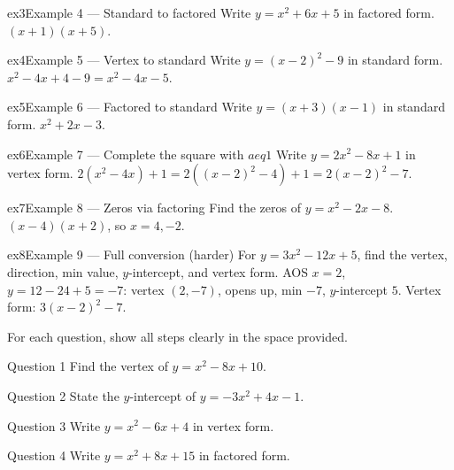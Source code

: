 \documentclass[11pt]{article}
\begin{document}
\begin{example}{ex3}{Example 4 --- Standard to factored}
Write $y=x^2+6x+5$ in factored form.
\soln $(x+1)(x+5).$
\end{example}

\begin{example}{ex4}{Example 5 --- Vertex to standard}
Write $y=(x-2)^2-9$ in standard form.
\soln $x^2-4x+4-9=x^2-4x-5.$
\end{example}

\begin{example}{ex5}{Example 6 --- Factored to standard}
Write $y=(x+3)(x-1)$ in standard form.
\soln $x^2+2x-3.$
\end{example}

\begin{example}{ex6}{Example 7 --- Complete the square with $a
eq1$}
Write $y=2x^2-8x+1$ in vertex form.
\soln $2(x^2-4x)+1=2((x-2)^2-4)+1=2(x-2)^2-7.$
\end{example}

\begin{example}{ex7}{Example 8 --- Zeros via factoring}
Find the zeros of $y=x^2-2x-8$.
\soln $(x-4)(x+2)$, so $x=4,-2.$
\end{example}

\begin{example}{ex8}{Example 9 --- Full conversion (harder)}
For $y=3x^2-12x+5$, find the vertex, direction, min value, $y$-intercept, and vertex form.
\soln AOS $x=2$, $y=12-24+5=-7$: vertex $(2,-7)$, opens up, min $-7$, $y$-intercept $5$. Vertex form: $3(x-2)^2-7.$
\end{example}

\clearpage
{}
For each question, show all steps clearly in the space provided.

\begin{qbox}{Question 1}
Find the vertex of $y=x^2-8x+10$.\workspace{2.2cm}
\end{qbox}

\begin{qbox}{Question 2}
State the $y$-intercept of $y=-3x^2+4x-1$.\workspace{1.8cm}
\end{qbox}

\begin{qbox}{Question 3}
Write $y=x^2-6x+4$ in vertex form.\workspace{2.2cm}
\end{qbox}

\begin{qbox}{Question 4}
Write $y=x^2+8x+15$ in factored form.\workspace{1.8cm}
\end{qbox}
\end{document}
